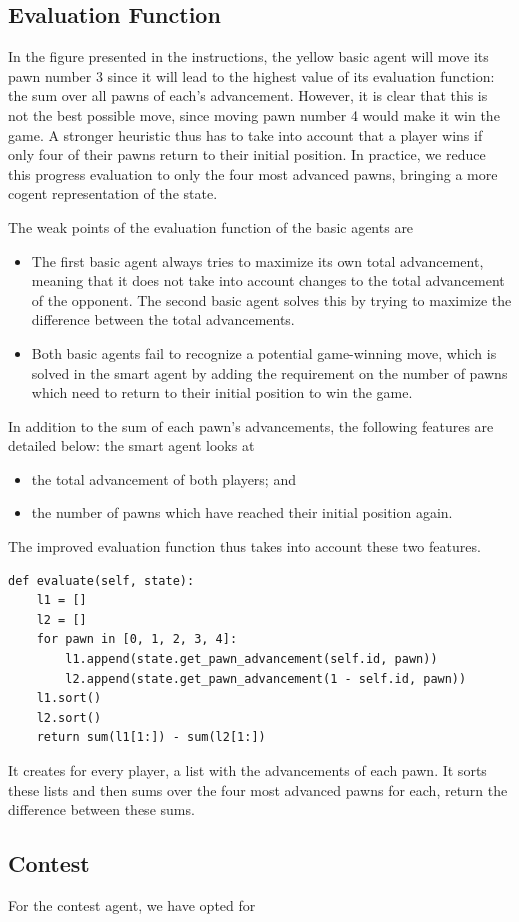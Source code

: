 \documentclass[journal,onecolumn]{IEEEtran}
\begin{document}
\subsection{Evaluation Function}
In the figure presented in the instructions, the yellow basic agent will move its pawn number 3 since it will lead to the highest value of its evaluation function: the sum over all pawns of each's advancement.
However, it is clear that this is not the best possible move, since moving pawn number 4 would make it win the game.
A stronger heuristic thus has to take into account that a player wins if only four of their pawns return to their initial position.
In practice, we reduce this progress evaluation to only the four most advanced pawns, bringing a more cogent representation of the state.

The weak points of the evaluation function of the basic agents are
\begin{itemize}
	\item The first basic agent always tries to maximize its own total advancement, meaning that it does not take into account changes to the total advancement of the opponent.
	The second basic agent solves this by trying to maximize the difference between the total advancements.
	\item Both basic agents fail to recognize a potential game-winning move, which is solved in the smart agent by adding the requirement on the number of pawns which need to return to their initial position to win the game.
\end{itemize}

In addition to the sum of each pawn’s advancements, the following features are detailed below: the smart agent looks at
\begin{itemize}
 \item the total advancement of both players; and
 \item the number of pawns which have reached their initial position again.
\end{itemize}

The improved evaluation function thus takes into account these two features.
\begin{verbatim}
def evaluate(self, state):
    l1 = []
    l2 = []
    for pawn in [0, 1, 2, 3, 4]:
        l1.append(state.get_pawn_advancement(self.id, pawn))
        l2.append(state.get_pawn_advancement(1 - self.id, pawn))
    l1.sort()
    l2.sort()
    return sum(l1[1:]) - sum(l2[1:])
\end{verbatim}
It creates for every player, a list with the advancements of each pawn.
It sorts these lists and then sums over the four most advanced pawns for each, return the difference between these sums.

\subsection{Contest}
For the contest agent, we have opted for 



\end{document}
